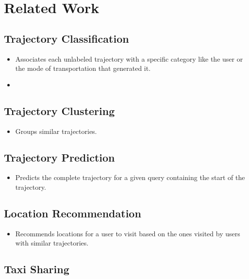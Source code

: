 \documentclass{article} %
\begin{document}
\section{Related Work}

\subsection{Trajectory Classification}

\begin{itemize}
    \item Associates each unlabeled trajectory with a specific category like the user or the mode of transportation that generated it.
    \item
\end{itemize}

\subsection{Trajectory Clustering}

\begin{itemize}
    \item Groups similar trajectories.
\end{itemize}

\subsection{Trajectory Prediction}

\begin{itemize}
    \item Predicts the complete trajectory for a given query containing the start of the trajectory.
\end{itemize}

\subsection{Location Recommendation}

\begin{itemize}
    \item Recommends locations for a user to visit based on the ones visited by users with similar trajectories.
\end{itemize}

\subsection{Taxi Sharing}
\end{document}
